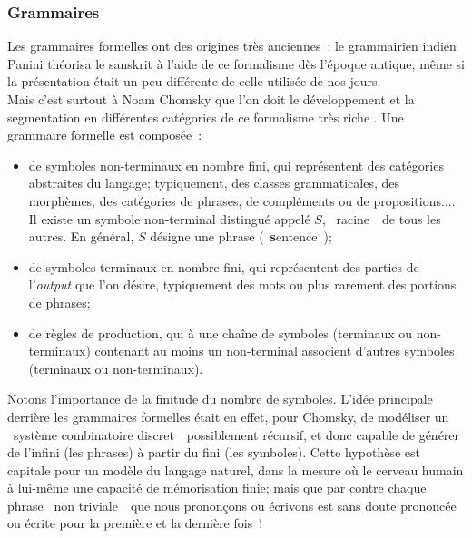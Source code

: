 \documentclass{article}
\begin{document}
			\subsubsection{Grammaires}\label{grammaires}
				Les grammaires formelles ont des origines très anciennes~: le grammairien indien Panini théorisa le sanskrit à l'aide de ce formalisme dès l'époque antique, même si la présentation était un peu différente de celle utilisée de nos jours.\\
				Mais c'est surtout à Noam Chomsky que l'on doit le développement et la segmentation en différentes catégories de ce formalisme très riche \autocite{chomsky1956}. Une grammaire formelle est composée~:
				\vspace{2mm}
				\begin{itemize}
					\item de symboles non-terminaux en nombre fini, qui représentent des catégories abstraites du langage; typiquement, des classes grammaticales, des morphèmes, des catégories de phrases, de compléments ou de propositions.... Il existe un symbole non-terminal distingué appelé $S$, \guillemotleft~racine~\guillemotright~de tous les autres. En général, $S$ désigne une phrase (\guillemotleft~\textbf{s}entence~\guillemotright);
					\item de symboles terminaux en nombre fini, qui représentent des parties de l'\textit{output} que l'on désire, typiquement des mots ou plus rarement des portions de phrases;
					\item de règles de production, qui à une chaîne de symboles (terminaux ou non-terminaux) contenant au moins un non-terminal associent d'autres symboles (terminaux ou non-terminaux).
				\end{itemize}
				\vspace{2mm}
				Notons l'importance de la finitude du nombre de symboles. L'idée principale derrière les grammaires formelles était en effet, pour Chomsky, de modéliser un \guillemotleft~système combinatoire discret~\guillemotright~possiblement récursif, et donc capable de générer de l'infini (les phrases) à partir du fini (les symboles). Cette hypothèse est capitale pour un modèle du langage naturel, dans la mesure où le cerveau humain à lui-même une capacité de mémorisation finie; mais que par contre chaque phrase \guillemotleft~non triviale~\guillemotright~que nous prononçons ou écrivons est sans doute prononcée ou écrite pour la première et la dernière fois~!\\
				
\end{document}
